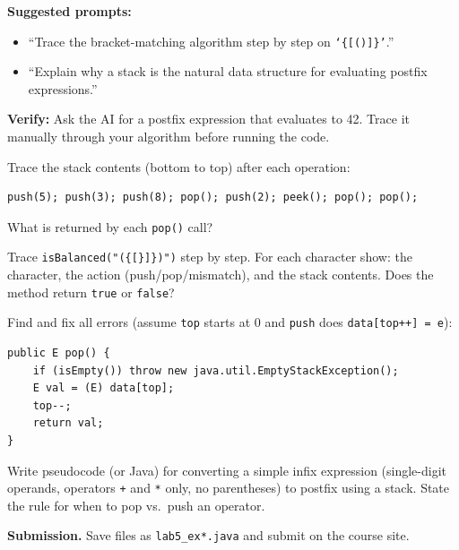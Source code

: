 \documentclass[11pt]{article}
\begin{document}
\begin{aicollab}
\textbf{Suggested prompts:}
\begin{itemize}[leftmargin=*,nosep]
  \item ``Trace the bracket-matching algorithm step by step on \texttt{`\{[()]\}'}.''
  \item ``Explain why a stack is the natural data structure for evaluating postfix expressions.''
\end{itemize}
\medskip\textbf{Verify:} Ask the AI for a postfix expression that evaluates to 42.
Trace it manually through your algorithm before running the code.
\end{aicollab}

\takehomebanner

\begin{trace}
Trace the stack contents (bottom to top) after each operation:
\begin{lstlisting}
push(5); push(3); push(8); pop(); push(2); peek(); pop(); pop();
\end{lstlisting}
What is returned by each \texttt{pop()} call?
\end{trace}

\begin{trace}
Trace \texttt{isBalanced("(\{[\}]\})")} step by step.
For each character show: the character, the action (push/pop/mismatch), and the stack contents.
Does the method return \texttt{true} or \texttt{false}?
\end{trace}

\begin{bug}
Find and fix all errors (assume \texttt{top} starts at 0 and \texttt{push} does \texttt{data[top++] = e}):
\begin{lstlisting}
public E pop() {
    if (isEmpty()) throw new java.util.EmptyStackException();
    E val = (E) data[top];
    top--;
    return val;
}
\end{lstlisting}
\end{bug}

\begin{writecode}
Write pseudocode (or Java) for converting a simple infix expression
(single-digit operands, operators \texttt{+} and \texttt{*} only, no parentheses)
to postfix using a stack.
State the rule for when to pop vs.\ push an operator.
\end{writecode}

\vspace{4pt}
\noindent\textbf{Submission.} Save files as \texttt{lab5\_ex*.java} and submit on the course site.
\end{document}
